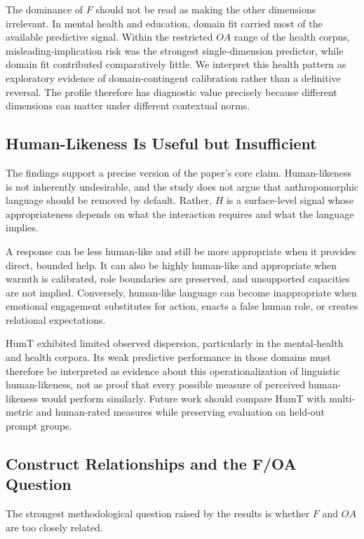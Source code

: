 \documentclass[manuscript,review,anonymous]{acmart}
\begin{document}
The dominance of $F$ should not be read as making the other dimensions irrelevant. In mental health and education, domain fit carried most of the available predictive signal. Within the restricted $OA$ range of the health corpus, misleading-implication risk was the strongest single-dimension predictor, while domain fit contributed comparatively little. We interpret this health pattern as exploratory evidence of domain-contingent calibration rather than a definitive reversal. The profile therefore has diagnostic value precisely because different dimensions can matter under different contextual norms.

\subsection{Human-Likeness Is Useful but Insufficient}

The findings support a precise version of the paper's core claim. Human-likeness is not inherently undesirable, and the study does not argue that anthropomorphic language should be removed by default. Rather, $H$ is a surface-level signal whose appropriateness depends on what the interaction requires and what the language implies.

A response can be less human-like and still be more appropriate when it provides direct, bounded help. It can also be highly human-like and appropriate when warmth is calibrated, role boundaries are preserved, and unsupported capacities are not implied. Conversely, human-like language can become inappropriate when emotional engagement substitutes for action, enacts a false human role, or creates relational expectations.

HumT exhibited limited observed dispersion, particularly in the mental-health and health corpora. Its weak predictive performance in those domains must therefore be interpreted as evidence about this operationalization of linguistic human-likeness, not as proof that every possible measure of perceived human-likeness would perform similarly. Future work should compare HumT with multi-metric and human-rated measures while preserving evaluation on held-out prompt groups.

\subsection{Construct Relationships and the F/OA Question}

The strongest methodological question raised by the results is whether $F$ and $OA$ are too closely related.
\end{document}

